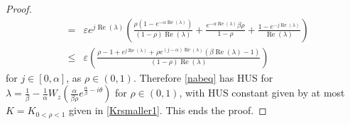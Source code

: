 \documentclass[10pt,a4paper]{amsart}
\begin{document}
\begin{proof}
\begin{eqnarray*}
 &=& \varepsilon e^{j\operatorname{Re}(\lambda)} \left(\frac{\rho(1-e^{-\alpha\operatorname{Re}(\lambda)})}{(1-\rho)\operatorname{Re}(\lambda)} + \frac{e^{-\alpha\operatorname{Re}(\lambda)}\beta \rho}{1-\rho} + \frac{1-e^{-j\operatorname{Re}(\lambda)}}{\operatorname{Re}(\lambda)}\right) \\
 &\le& \varepsilon\left(\frac{\rho-1+e^{j\operatorname{Re}(\lambda)}+\rho e^{(j-\alpha)\operatorname{Re}(\lambda)}\left(\beta\operatorname{Re}(\lambda)-1\right)}{(1-\rho)\operatorname{Re}(\lambda)}\right)
\end{eqnarray*}
for $j\in[0,\alpha]$, as $\rho\in(0,1)$.
Therefore \eqref{nabeq} has HUS for $\lambda = \frac{1}{\beta}-\frac{1}{\alpha}W_z\left(\frac{\alpha}{\beta \rho}e^{\frac{\alpha}{\beta}-i\theta}\right)$ for $\rho\in(0,1)$, with HUS constant given by at most $K=K_{0<\rho<1}$ given in \eqref{Krsmaller1}.
This ends the proof.
\end{proof}
\end{document}
